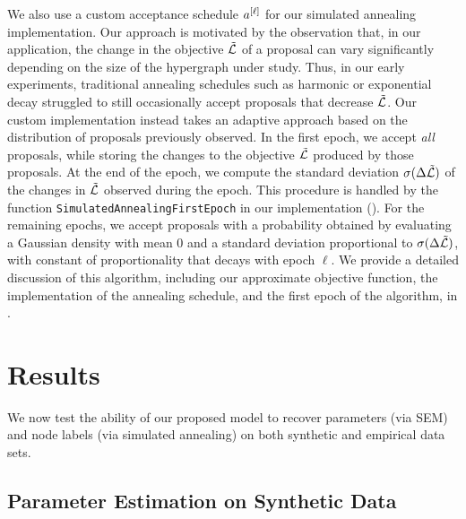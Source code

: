 \documentclass[aps,pre,reprint,superscriptaddress,nofootinbib]{revtex4-2}
\begin{document}
    We also use a custom acceptance schedule $a^{[\ell]}$ for our simulated annealing implementation.
    Our approach is motivated by the observation that, in our application, the change in the objective $\tilde{\mathcal{L}}$ of a proposal can vary significantly depending on the size of the hypergraph under study.
    Thus, in our early experiments, traditional annealing schedules such as harmonic or exponential decay struggled to still occasionally accept proposals that decrease $\tilde{\mathcal{L}}$. 
    Our custom implementation instead takes an adaptive approach based on the distribution of proposals previously observed. 
    In the first epoch, we accept \emph{all} proposals, while storing the changes to the objective $\tilde{\mathcal{L}}$ produced by those proposals. 
    At the end of the epoch, we compute the standard deviation $\sigma(\Delta \tilde{\mathcal{L}})$ of the changes in $\tilde{\mathcal{L}}$ observed during the epoch. 
    This procedure is handled by the function \texttt{SimulatedAnnealingFirstEpoch} in our implementation ().
    For the remaining epochs, we accept proposals with a probability obtained by evaluating a Gaussian density with mean 0 and a standard deviation proportional to $\sigma(\Delta \tilde{\mathcal{L}})$, with constant of proportionality that decays with epoch $\ell$.
    We provide a detailed discussion of this algorithm, including our approximate objective function, the implementation of the annealing schedule, and the first epoch of the algorithm, in . 
    
    
    


\section{Results} \label{sec:results}

    We now test the ability of our proposed \model{} model to recover parameters (via SEM) and node labels (via simulated annealing) on both synthetic and empirical data sets.



\subsection{Parameter Estimation on Synthetic Data}
\end{document}
